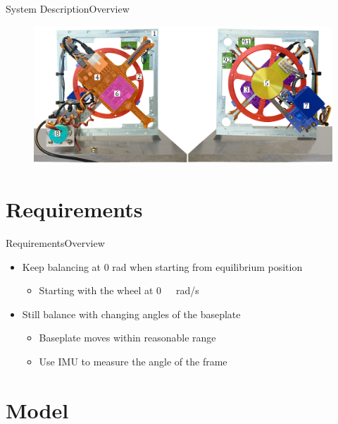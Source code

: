 \begin{frame}{System Description}{Overview}
	\begin{figure}[H]
		\centering
		\includegraphics[scale=0.16]{Pictures/Cubli12.png}
	\end{figure}
\end{frame}

\section{Requirements}

\begin{frame}{Requirements}{Overview}
\begin{itemize}
 \item {Keep balancing at 0 rad when starting from equilibrium position}
  \begin{itemize}
	\item {Starting with the wheel at \si{0\ rad/s}}
	\linebreak
\end{itemize}
\item {Still balance with changing angles of the baseplate}
	\begin{itemize}
	\item {Baseplate moves within reasonable range}
	\item {Use IMU to measure the angle of the frame}
	\end{itemize}
\end{itemize}


\end{frame}

\section{Model}

